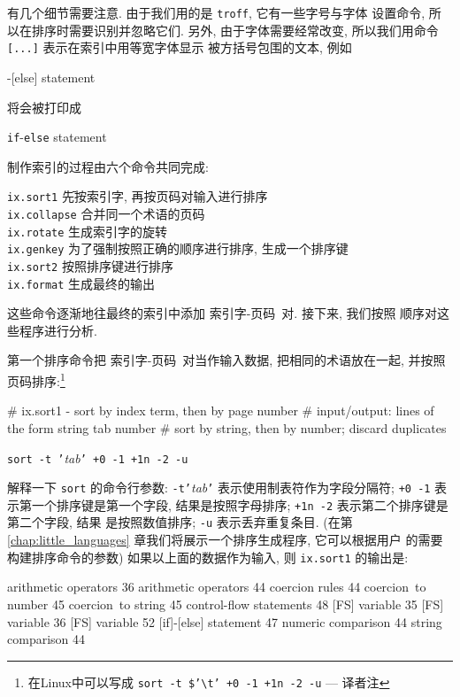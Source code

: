 有几个细节需要注意. 由于我们用的是 \texttt{troff}, 它有一些字号与字体
设置命令, 所以在排序时需要识别并忽略它们. 另外, 由于字体需要经常改变,
所以我们用命令 \texttt{[...]} 表示在索引中用等宽字体显示
被方括号包围的文本, 例如
\begin{awkcode}
    [if]-[else] statement
\end{awkcode}
将会被打印成
\begin{pattern}
    \texttt{if}-\texttt{else} statement
\end{pattern}

制作索引的过程由六个命令共同完成:
\begin{tabbing}
\indent\texttt{ix.sort1} \hspace{5em} \= 先按索引字, 再按页码对输入进行排序 \\
\indent\texttt{ix.collapse}    \> 合并同一个术语的页码 \\
\indent\texttt{ix.rotate}  \> 生成索引字的旋转 \\
\indent\texttt{ix.genkey}  \> 为了强制按照正确的顺序进行排序, 生成一个排序键 \\
\indent\texttt{ix.sort2}   \> 按照排序键进行排序 \\
\indent\texttt{ix.format}  \> 生成最终的输出
\end{tabbing}
这些命令逐渐地往最终的索引中添加 \mbox{索引字}-页码\ 对. 接下来, 我们按照
顺序对这些程序进行分析.

第一个排序命令把 \mbox{索引字}-页码\ 对当作输入数据, 把相同的术语放在一起,
并按照页码排序:\footnote{ 在Linux中可以写成
    \texttt{sort -t \$'{\textbackslash}t' +0 -1 +1n -2 -u} --- 译者注}
\begin{awkcode}
    # ix.sort1 - sort by index term, then by page number
    #     input/output: lines of the form string tab number
    #     sort by string, then by number; discard duplicates
\end{awkcode}
\indent\indent\texttt{sort -t '}\textit{tab}\texttt{' +0 -1 +1n -2 -u} \par
解释一下 \texttt{sort} 的命令行参数: \texttt{-t'}\textit{tab}\texttt{'}
表示使用制表符作为字段分隔符; \texttt{+0 -1} 表示第一个排序键是第一个字段,
结果是按照字母排序; \texttt{+1n -2} 表示第二个排序键是第二个字段, 结果
是按照数值排序; \texttt{-u} 表示丢弃重复条目. (在第
\ref{chap:little_languages} 章我们将展示一个排序生成程序, 它可以根据用户
的需要构建排序命令的参数) 如果以上面的数据作为输入, 则 \texttt{ix.sort1}
的输出是:
\begin{awkcode}
    arithmetic operators        36
    arithmetic operators        44
    coercion rules      44
    coercion~to number  45
    coercion~to string  45
    control-flow statements     48
    [FS] variable       35
    [FS] variable       36
    [FS] variable       52
    [if]-[else] statement       47
    numeric comparison  44
    string comparison   44
\end{awkcode}

